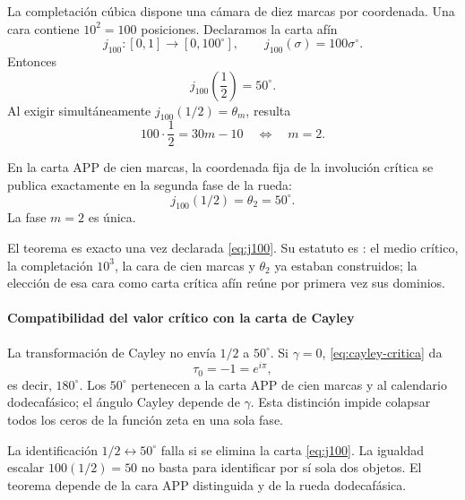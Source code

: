 La completación cúbica dispone una cámara de diez marcas por coordenada. Una
cara contiene \(10^2=100\) posiciones. Declaramos la carta afín
\begin{equation}
j_{100}:[0,1]\longrightarrow[0,100^\circ],
\qquad j_{100}(\sigma)=100\sigma^\circ.
\label{eq:j100}
\end{equation}
Entonces
\[
j_{100}\left(\frac12\right)=50^\circ.
\]
Al exigir simultáneamente \(j_{100}(1/2)=\theta_m\), resulta
\[
100\cdot\frac12=30m-10
\quad\Longleftrightarrow\quad m=2.
\]

\begin{theorem}
En la carta APP de cien marcas, la coordenada fija de la involución crítica
se publica exactamente en la segunda fase de la rueda:
\begin{equation}
\boxed{j_{100}(1/2)=\theta_2=50^\circ.}
\label{eq:igualador-50}
\end{equation}
La fase \(m=2\) es única.
\end{theorem}

El teorema es exacto una vez declarada \eqref{eq:j100}. Su estatuto es
: el medio crítico, la completación \(10^3\), la
cara de cien marcas y \(\theta_2\) ya estaban construidos; la elección de esa
cara como carta crítica afín reúne por primera vez sus dominios.

\paragraph{Compatibilidad del valor crítico con la carta de Cayley}

La transformación de Cayley no envía \(1/2\) a \(50^\circ\). Si
\(\gamma=0\), \eqref{eq:cayley-critica} da
\[
\tau_0=-1=e^{i\pi},
\]
es decir, \(180^\circ\). Los \(50^\circ\) pertenecen a la carta APP de cien
marcas y al calendario dodecafásico; el ángulo Cayley depende de \(\gamma\).
Esta distinción impide colapsar todos los ceros de la función zeta en una sola
fase.

\begin{falsifier}
La identificación \(1/2\leftrightarrow50^\circ\) falla si se elimina la
carta \eqref{eq:j100}. La igualdad escalar \(100(1/2)=50\) no basta para
identificar por sí sola dos objetos. El teorema depende de la cara APP
distinguida y de la rueda dodecafásica.
\end{falsifier}

